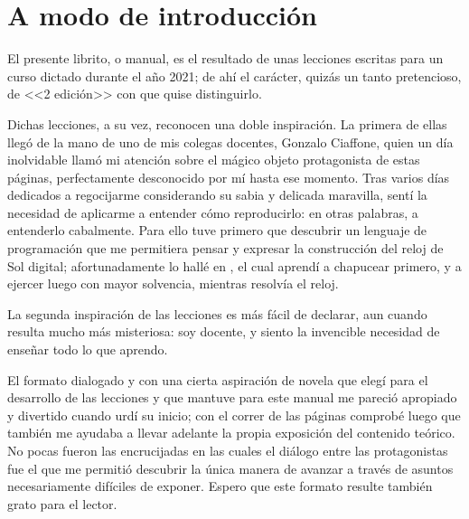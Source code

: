 \chapter{A modo de introducción}

El presente librito, o manual, es el resultado de unas lecciones
escritas para un curso dictado durante el año 2021; de ahí el
carácter, quizás un tanto pretencioso, de <<2 edición>> con
que quise distinguirlo.

Dichas lecciones, a su vez, reconocen una doble inspiración. La
primera de ellas llegó de la mano de uno de mis colegas docentes,
Gonzalo Ciaffone, quien un día inolvidable llamó mi atención sobre el
mágico objeto protagonista de estas páginas, perfectamente desconocido
por mí hasta ese momento. Tras varios días dedicados a regocijarme
considerando su sabia y delicada maravilla, sentí la necesidad de
aplicarme a entender cómo reproducirlo: en otras palabras, a
entenderlo cabalmente. Para ello tuve primero que descubrir un
lenguaje de programación que me permitiera pensar y expresar la
construcción del reloj de Sol digital; afortunadamente lo hallé en
\openscad, el cual aprendí a chapucear primero, y a ejercer luego con
mayor solvencia, mientras resolvía el reloj.

La segunda inspiración de las lecciones es más fácil de declarar, aun
cuando resulta mucho más misteriosa: soy docente, y siento la
invencible necesidad de enseñar todo lo que aprendo.

El formato dialogado y con una cierta aspiración de novela que elegí
para el desarrollo de las lecciones y que mantuve para este manual me
pareció apropiado y divertido cuando urdí su inicio; con el correr de
las páginas comprobé luego que también me ayudaba a llevar adelante la
propia exposición del contenido teórico. No pocas fueron las
encrucijadas en las cuales el diálogo entre las protagonistas fue el
que me permitió descubrir la única manera de avanzar a través de
asuntos necesariamente difíciles de exponer. Espero que este formato
resulte también grato para el lector.

